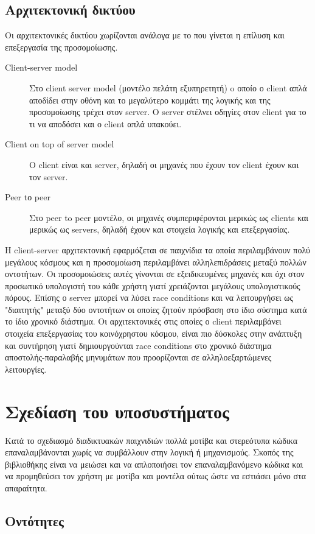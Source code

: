 		\subsection{Aρχιτεκτονική δικτύου}
			Οι αρχιτεκτονικές δικτύου χωρίζονται ανάλογα με το που γίνεται η επίλυση και επεξεργασία της προσομοίωσης.  
		\begin{description}	
			\item [Client-server model] Στο client server model (μοντέλο πελάτη εξυπηρετητή) o οποίο ο client απλά αποδίδει στην οθόνη και το μεγαλύτερο κομμάτι της λογικής και της προσομοίωσης τρέχει στον server. Ο server στέλνει οδηγίες στον client για το τι να αποδόσει και ο client απλά υπακούει.
			\item [Client on top of server model] Ο client είναι και server, δηλαδή οι μηχανές που έχουν τον client έχουν και τον server.
			\item [Peer tο peer] Στο peer to peer μοντέλο, οι μηχανές συμπεριφέρονται μερικώς ως clients και μερικώς ως servers, δηλαδή έχουν και στοιχεία λογικής και επεξεργασίας.
		\end{description}
			Η client-server αρχιτεκτονική εφαρμόζεται σε παιχνίδια τα οποία περιλαμβάνουν πολύ μεγάλους κόσμους και η προσομοίωση περιλαμβάνει αλληλεπιδράσεις μεταξύ πολλών οντοτήτων. Οι προσομοιώσεις αυτές γίνονται σε εξειδικευμένες μηχανές και όχι στον προσωπικό υπολογιστή του κάθε χρήστη γιατί χρειάζονται μεγάλους υπολογιστικούς πόρους. Επίσης ο server μπορεί να λύσει race conditions και να λειτουργήσει ως "διαιτητής" μεταξύ δύο οντοτήτων οι οποίες ζητούν πρόσβαση στο ίδιο σύστημα κατά το ίδιο χρονικό διάστημα. Οι αρχιτεκτονικές στις οποίες ο client περιλαμβάνει στοιχεία επεξεργασίας του κοινόχρηστου κόσμου, είναι πιο δύσκολες στην ανάπτυξη και συντήρηση γιατί δημιουργούνται race conditions στο χρονικό διάστημα αποστολής-παραλαβής μηνυμάτων που προορίζονται σε αλληλοεξαρτώμενες λειτουργίες.
			
		\section{Σχεδίαση του υποσυστήματος}
		Κατά το σχεδιασμό διαδικτυακών παιχνιδιών πολλά μοτίβα και στερεότυπα κώδικα επαναλαμβάνονται χωρίς να συμβάλλουν στην λογική ή μηχανισμούς. Σκοπός της βιβλιοθήκης είναι να μειώσει και να απλοποιήσει τον επαναλαμβανόμενο κώδικα και να προμηθεύσει τον χρήστη με μοτίβα και μοντέλα ούτως ώστε να εστιάσει μόνο στα απαραίτητα.
		
		\subsection{Οντότητες}
